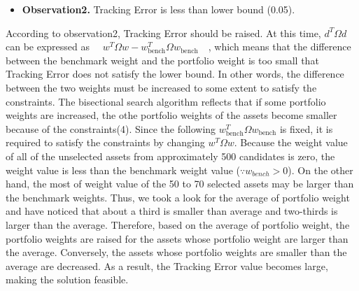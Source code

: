 \documentclass[11pt]{article}
\begin{document}
\begin{itemize}
\begin{itemize}
		\item[] \textbf{Observation2.} Tracking Error is less than lower bound (0.05).
	\end{itemize}
	According to observation2, Tracking Error should be raised. At this time, $d^T\Omega d$ can be expressed as $\quad w^T\Omega  w - w_{\text{bench}}^T\Omega  w_{\text{bench}} \quad$, which means that the difference between the benchmark weight and the portfolio weight is too small that Tracking Error does not satisfy the lower bound. In other words, the difference between the two weights must be increased to some extent to satisfy the constraints. The bisectional search algorithm reflects that if some portfolio weights are increased, the othe portfolio weights of the assets become smaller because of the constraints(4). Since the following $  w_{\text{bench}}^T\Omega  w_{\text{bench}}  $ is fixed, it is required to satisfy the constraints by changing $w^T\Omega  w $. Because the weight value of all of the unselected assets from approximately 500 candidates is zero, the weight value is less than the benchmark weight value ($\because w_{bench} > 0$). On the other hand, the most of weight value of the 50 to 70 selected assets may be larger than the benchmark weights. Thus, we took a look for the average of portfolio weight and have noticed that about a third is smaller than average and two-thirds is larger than the average. Therefore, based on the average of portfolio weight, the portfolio weights are raised for the assets whose portfolio weight are larger than the average. Conversely, the assets whose portfolio weights are smaller than the average are decreased. As a result, the Tracking Error value becomes large, making the solution feasible.


\end{itemize}
\end{document}
